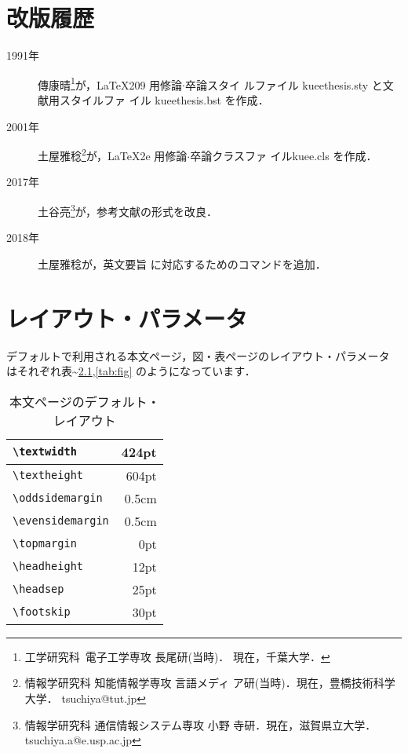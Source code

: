 \documentclass[
  sotsuron]{kuee}
\begin{document}



\appendix
\chapter{改版履歴}\label{chap:history}
\begin{description}
  \item[1991年] 傳康晴\footnote{工学研究科\ 電子工学専攻 長尾研(当時)．
          現在，千葉大学．}が，\LaTeX{}209 用修論$\cdot$卒論スタイ
        ルファイル {\ttfamily kueethesis.sty} と文献用スタイルファ
        イル {\ttfamily kueethesis.bst} を作成\cite{OldTebiki}．
  \item[2001年] 土屋雅稔\footnote{情報学研究科 知能情報学専攻 言語メディ
        ア研(当時)．現在，豊橋技術科学大学．{\ttfamily
        tsuchiya@tut.jp}}が，\LaTeX2e{} 用修論$\cdot$卒論クラスファ
        イル{\ttfamily kuee.cls} を作成\cite{Tebiki2004}．
        \setcounter{tsuaffil}{\value{footnote}}
  \item[2017年] 土谷亮\footnote{情報学研究科 通信情報システム専攻 小野
        寺研．現在，滋賀県立大学．{\ttfamily
        tsuchiya.a@e.usp.ac.jp}}が，参考文献の形式を改良．
  \item[2018年] 土屋雅稔\footnotemark[\value{tsuaffil}]{}が，英文要旨
        に対応するためのコマンドを追加．
\end{description}

\chapter{レイアウト・パラメータ}\label{chap:layout}

デフォルトで利用される本文ページ，図・表ページのレイアウト・パラメータ
はそれぞれ表\textasciitilde{}\ref{tab:text},\ref{tab:fig}
のようになっています．

\begin{table}
  \caption{本文ページのデフォルト・レイアウト}\label{tab:text}
  \begin{center}
    \begin{tabular}{|l|r|}
      \hline
      \verb+\textwidth+ & 424pt \\ \hline
      \verb+\textheight+ & 604pt \\ \hline
      \verb+\oddsidemargin+ & 0.5cm \\ \hline
      \verb+\evensidemargin+ & 0.5cm \\ \hline
      \verb+\topmargin+ & 0pt   \\ \hline
      \verb+\headheight+ & 12pt  \\ \hline
      \verb+\headsep+ & 25pt  \\ \hline
      \verb+\footskip+ & 30pt  \\ \hline
    \end{tabular}
  \end{center}
\end{table}
\end{document}
